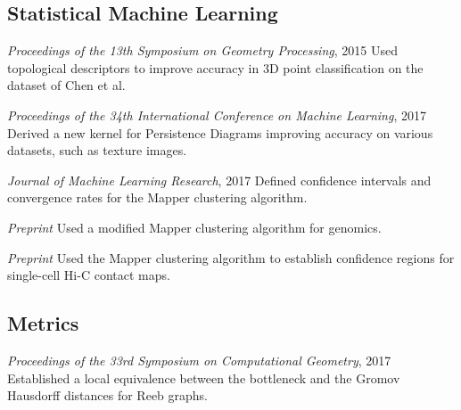 \documentclass[11pt,a4paper]{moderncv}
\begin{document}
	\subsection{Statistical Machine Learning}

			  {\textit{Proceedings of the 13th Symposium on Geometry Processing}, 2015}
                          {}{}{\small Used topological descriptors to improve accuracy in 3D point classification on the dataset of Chen et al.}

                          {\textit{Proceedings of the 34th International Conference on Machine Learning}, 2017}
			  {}{}{\small Derived a new kernel for Persistence Diagrams improving accuracy on various datasets, such as texture images. }

                          {\textit{Journal of Machine Learning Research}, 2017}
                          {}{}{\small Defined confidence intervals and convergence rates for the Mapper clustering algorithm.}

                          {\textit{Preprint}}
                          {}{}{\small Used a modified Mapper clustering algorithm for genomics.}

                          {\textit{Preprint}}
                          {}{}{\small Used the Mapper clustering algorithm to establish confidence regions for single-cell Hi-C contact maps.}
	

	\subsection{Metrics}	
                          { \textit{Proceedings of the 33rd Symposium on Computational Geometry}, 2017}
                          {}{}{\small Established a local equivalence between the bottleneck and the Gromov Hausdorff distances for Reeb graphs.}
\end{document}
